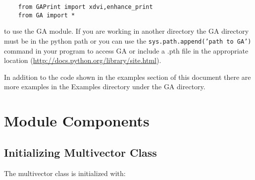 \documentclass[10pt]{article}
\newcommand{\T}[1]{\texttt{#1}}
\begin{document}
\begin{lstlisting}
    from GAPrint import xdvi,enhance_print
    from GA import *
\end{lstlisting}

to use the GA module.  If you are working in another directory the GA directory must be in the python path or
you can use the \T{sys.path.append('path to GA')} command in your program to access GA or include a .pth file
in the appropriate location (\url{http://docs.python.org/library/site.html}).

In addition to the code shown in the examples section of this document there are more examples in the Examples directory under the
GA directory.

\section{Module Components}

\subsection{Initializing Multivector Class}

The multivector class is initialized with:
\end{document}
